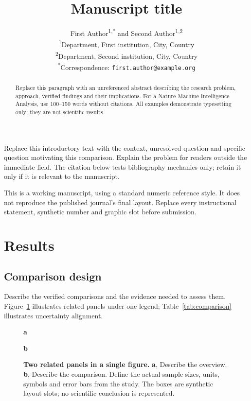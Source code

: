 \documentclass[11pt]{article}
\title{Manuscript title}
\author{First Author\textsuperscript{1,*} and Second Author\textsuperscript{1,2}\\
  \small \textsuperscript{1}Department, First institution, City, Country\\
  \small \textsuperscript{2}Department, Second institution, City, Country\\
  \small \textsuperscript{*}Correspondence: \texttt{first.author@example.org}}
\date{}
\begin{document}
\maketitle
\begin{abstract}
Replace this paragraph with an unreferenced abstract describing the research
problem, approach, verified findings and their implications. For a Nature
Machine Intelligence Analysis, use 100--150 words without citations.
All examples demonstrate typesetting only; they are not scientific results.
\end{abstract}

Replace this introductory text with the context, unresolved question and
specific question motivating this comparison. Explain the problem for readers outside
the immediate field. The citation below tests bibliography mechanics only;
retain it only if it is relevant to the manuscript\cite{wilkinson2016fair}.

This is a working manuscript, using a standard numeric reference style.
It does not reproduce the published journal's final layout. Replace every
instructional statement, synthetic number and graphic slot before submission.

\section{Results}\label{sec:results}
\subsection{Comparison design}
Describe the verified comparisons and the evidence needed to assess them. Figure~\ref{fig:comparison} illustrates related panels under one
legend; Table~\ref{tab:comparison} illustrates uncertainty alignment.

\begin{figure}[htbp]
\centering
\begin{minipage}[t]{0.47\linewidth}
\raggedright\textbf{a}\par\smallskip
{}
\end{minipage}\hfill
\begin{minipage}[t]{0.47\linewidth}
\raggedright\textbf{b}\par\smallskip
{}
\end{minipage}
\caption{\textbf{Two related panels in a single figure.} \textbf{a}, Describe
the overview. \textbf{b}, Describe the comparison. Define the actual sample
sizes, units, symbols and error bars from the study. The boxes are synthetic
layout slots; no scientific conclusion is represented.}
\label{fig:comparison}
\end{figure}
\end{document}
